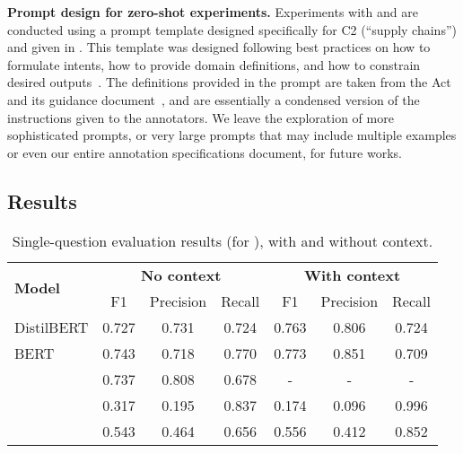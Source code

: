 \textbf{Prompt design for zero-shot experiments.} Experiments with \gptthree{} and \gptfour{} are conducted using a prompt template designed specifically for C2 (``supply chains'') and given in \appendixPromptDesign{}. This template was designed following best practices on how to formulate intents, how to provide domain definitions, and how to constrain desired outputs~\cite{ekin2023prompt}. The definitions provided in the prompt are taken from the Act and its guidance document~\cite{amsa2018_legislation, amsa2018_guidance2023}, and are essentially a condensed version of the instructions given to the annotators. We leave the exploration of more sophisticated prompts, or very large prompts that may include multiple examples or even our entire annotation specifications document, for future works.

\subsection{Results}

\begin{table}[t]
    \centering
    \caption{Single-question evaluation results (for \ctwo{}), with and without context.}
    \vspace{2mm}
    \label{tab:experiments:results:c2supplychains}
    \begin{tabular}{lcccccc}
        \multirow{2}{*}[-1mm]{\textbf{Model}} & \multicolumn{3}{c}{\textbf{No context}} & \multicolumn{3}{c}{\textbf{With context}} \\
        \cmidrule(lr){2-4} \cmidrule(lr){5-7}
                     & F1    & Precision & Recall & F1    & Precision & Recall \\
        \midrule
        DistilBERT   & 0.727 & 0.731     & 0.724  & 0.763 & 0.806     & 0.724 \\
        BERT         & 0.743 & 0.718     & 0.770  & 0.773 & 0.851     & 0.709 \\
        \llama{}     & 0.737 & 0.808     & 0.678  & -     & -         & -     \\
        \midrule
        \gptthree{}  & 0.317 & 0.195     & 0.837  & 0.174 & 0.096     & 0.996 \\
        \gptfour{}   & 0.543 & 0.464     & 0.656  & 0.556 & 0.412     & 0.852 \\
    \end{tabular}
\end{table}

